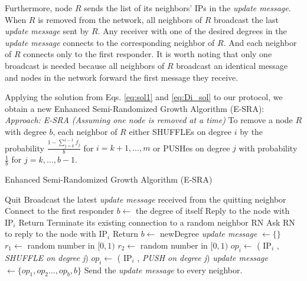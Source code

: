 Furthermore, node $R$ sends the list of its neighbors' IPs in the \textit{update message}. When $R$ is removed from the network, all neighbors of $R$ broadcast the last \textit{update message} sent by $R$. Any receiver with one of the desired degrees in the \textit{update message} connects to the corresponding neighbor of $R$. And each neighbor of $R$ connects only to the first responder. It is worth noting that only one broadcast is needed because all neighbors of $R$ broadcast an identical message and nodes in the network forward the first message they receive.

Applying the solution from Eqs. \ref{eq:sol1} and \ref{eq:Di_sol} to our protocol, we obtain a new Enhanced Semi-Randomized Growth Algorithm (E-SRA): 
\\

\textit{Approach: E-SRA (Assuming one node is removed at a time)} To remove a node $R$ with degree $b$, each neighbor of $R$ either SHUFFLEs on degree $i$ by the probability $\frac{1 - \sum_{j=k}^{i-1} f_j}{b}$ for $i=k+1,\ldots, m $ or PUSHes on degree $j$ with probability $\frac{1}{b}$ for $j=k,\ldots, b-1$.\\

\begin{algorithm}
\caption{Enhanced Semi-Randomized Growth Algorithm (E-SRA)}\label{alg:1}
\begin{algorithmic}[1]
\State Quit
\EndProcedure
{}
\State Broadcast the latest \textit{update message} received from the quitting neighbor
 \State Connect to the first responder
\EndProcedure
{}
\State $b \gets$ the degree of itself
    \State Reply to the node with ${\text{IP}}_i$
    \State Return
    \State Terminate its existing connection to a random neighbor RN
    \State Ask RN to reply to the node with ${\text{IP}}_i$ 
    \State Return
  \EndIf
 \EndFor
\EndProcedure
{}
\State $b \gets$ newDegree 
 \State \textit{update message} $\gets \{\}$
  \State $r_1 \gets$ random number in $[0, 1)$
  \State $r_2 \gets$ random number in $[0, 1)$
      \If {$r_2 \in [v_j, v_{j+1})$}
        \State $op_i \gets$ ( ${\text{IP}}_i$ , \textit{SHUFFLE on degree j})
      \EndIf
    \EndFor
  \Else
      \If {$r_2 \in [u_j, u_{j+1})$}
        \State $op_i \gets$ ( ${\text{IP}}_i$ , \textit{PUSH on degree j})
      \EndIf
    \EndFor
  \EndIf
  \EndFor
  \State \textit{update message} $\gets \{op_1,op_2\ldots,op_b,b\}$
  \State Send the \textit{update message} to every neighbor.
\EndProcedure
\end{algorithmic}
\end{algorithm}

